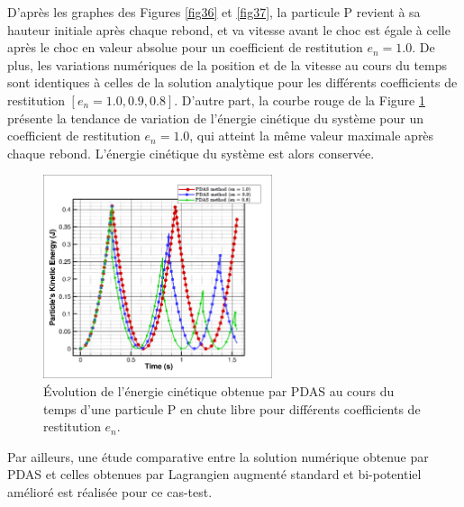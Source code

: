 D'après les graphes des Figures \ref{fig36} et \ref{fig37}, la particule P revient à sa hauteur initiale après chaque rebond, et va vitesse avant le choc est égale à celle après le choc en valeur absolue pour un coefficient de restitution $e_n = 1.0$. De plus, les variations numériques de la position et de la vitesse au cours du temps sont identiques à celles de la solution analytique pour les différents coefficients de restitution $[e_n = 1.0, 0.9, 0.8]$. D'autre part, la courbe rouge de la Figure \ref{fig38} présente la tendance de variation de l'énergie cinétique du système pour un coefficient de restitution $e_n = 1.0$, qui atteint la même valeur maximale après chaque rebond. L'énergie cinétique du système est alors conservée. 
    
\begin{figure}[!h]
  \centering
    \includegraphics[width=0.6\textwidth]{chapitres/chapitre_3/figures/ec_it_free_falling_particule_en=varied_AS(AM).png}
    \caption{\centering Évolution de l'énergie cinétique obtenue par PDAS au cours du temps d'une particule P en chute libre pour différents coefficients de restitution $e_n$.}\label{fig38}
\end{figure}

Par ailleurs, une étude comparative entre la solution numérique obtenue par PDAS et celles obtenues par Lagrangien augmenté standard et bi-potentiel amélioré est réalisée pour ce cas-test. 

